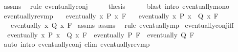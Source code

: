 \begin{isabellebody}
\ assms\ \isamarkupfalse%
\ {\isacharparenleft}{\kern0pt}rule\ eventually{\isacharunderscore}{\kern0pt}conj{\isacharparenright}{\kern0pt}\isanewline
\ \ \isamarkupfalse%
\ \isamarkupfalse%
\ {\isacharquery}{\kern0pt}thesis\isanewline
\ \ \ \ \isamarkupfalse%
\ {\isacharparenleft}{\kern0pt}blast\ intro{\isacharcolon}{\kern0pt}\ eventually{\isacharunderscore}{\kern0pt}mono{\isacharparenright}{\kern0pt}\isanewline
{}\isamarkupfalse%
%
\endisatagproof
{\isafoldproof}%
%
\isadelimproof
\isanewline
%
\endisadelimproof
\isanewline
{}\isamarkupfalse%
\ eventually{\isacharunderscore}{\kern0pt}rev{\isacharunderscore}{\kern0pt}mp{\isacharcolon}{\kern0pt}\isanewline
\ \ \ {\isachardoublequoteopen}eventually\ {\isacharparenleft}{\kern0pt}{\isasymlambda}x{\isachardot}{\kern0pt}\ P\ x{\isacharparenright}{\kern0pt}\ F{\isachardoublequoteclose}\isanewline
\ \ \ {\isachardoublequoteopen}eventually\ {\isacharparenleft}{\kern0pt}{\isasymlambda}x{\isachardot}{\kern0pt}\ P\ x\ {\isasymlongrightarrow}\ Q\ x{\isacharparenright}{\kern0pt}\ F{\isachardoublequoteclose}\isanewline
\ \ \ {\isachardoublequoteopen}eventually\ {\isacharparenleft}{\kern0pt}{\isasymlambda}x{\isachardot}{\kern0pt}\ Q\ x{\isacharparenright}{\kern0pt}\ F{\isachardoublequoteclose}\isanewline
%
\isadelimproof
%
\endisadelimproof
%
\isatagproof
{}\isamarkupfalse%
\ assms{\isacharparenleft}{\kern0pt}{}{\isacharparenright}{\kern0pt}\ assms{\isacharparenleft}{\kern0pt}{}{\isacharparenright}{\kern0pt}\ \isamarkupfalse%
\ {\isacharparenleft}{\kern0pt}rule\ eventually{\isacharunderscore}{\kern0pt}mp{\isacharparenright}{\kern0pt}%
\endisatagproof
{\isafoldproof}%
%
\isadelimproof
\isanewline
%
\endisadelimproof
\isanewline
{}\isamarkupfalse%
\ eventually{\isacharunderscore}{\kern0pt}conj{\isacharunderscore}{\kern0pt}iff{\isacharcolon}{\kern0pt}\isanewline
\ \ {\isachardoublequoteopen}eventually\ {\isacharparenleft}{\kern0pt}{\isasymlambda}x{\isachardot}{\kern0pt}\ P\ x\ {\isasymand}\ Q\ x{\isacharparenright}{\kern0pt}\ F\ {\isasymlongleftrightarrow}\ eventually\ P\ F\ {\isasymand}\ eventually\ Q\ F{\isachardoublequoteclose}\isanewline
%
\isadelimproof
\ \ %
\endisadelimproof
%
\isatagproof
{}\isamarkupfalse%
\ {\isacharparenleft}{\kern0pt}auto\ intro{\isacharcolon}{\kern0pt}\ eventually{\isacharunderscore}{\kern0pt}conj\ elim{\isacharcolon}{\kern0pt}\ eventually{\isacharunderscore}{\kern0pt}rev{\isacharunderscore}{\kern0pt}mp{\isacharparenright}{\kern0pt}%

\end{isabellebody}
